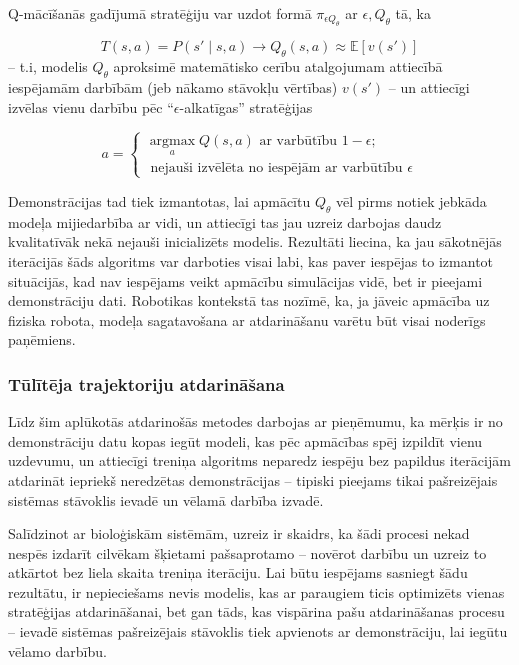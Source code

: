 \documentclass[12pt, a4paper]{article}
\numberwithin{equation}{section} %
\begin{document}
Q-mācīšanās gadījumā stratēģiju var uzdot formā $\pi_{\epsilon Q_{\theta}}$ ar $\epsilon, Q_{\theta}$ tā, ka

\begin{equation}
    T(s,a) = P(s'\mid s,a) \rightarrow Q_{\theta}(s,a) \approx \mathbb{E}[v(s')] 
\end{equation}
-- t.i, modelis $Q_{\theta}$ aproksimē matemātisko cerību atalgojumam attiecībā iespējamām darbībām (jeb nākamo stāvokļu vērtības) $v(s')$ -- un attiecīgi izvēlas vienu darbību pēc ``$\epsilon$-alkatīgas'' stratēģijas

\begin{equation}
    a = 
    \begin{cases}
        \operatorname*{argmax}_a Q(s,a) \text{ ar varbūtību } 1-\epsilon; \\
        \text{ nejauši izvēlēta no iespējām ar varbūtību } \epsilon
    \end{cases} 
\end{equation}

Demonstrācijas tad tiek izmantotas, lai apmācītu $Q_{\theta}$ vēl pirms notiek jebkāda modeļa mijiedarbība ar vidi, un attiecīgi tas jau uzreiz darbojas daudz kvalitatīvāk nekā nejauši inicializēts modelis. Rezultāti liecina, ka jau sākotnējās iterācijās šāds algoritms var darboties visai labi, kas paver iespējas to izmantot situācijās, kad nav iespējams veikt apmācību simulācijas vidē, bet ir pieejami demonstrāciju dati. Robotikas kontekstā tas nozīmē, ka, ja jāveic apmācība uz fiziska robota, modeļa sagatavošana ar atdarināšanu varētu būt visai noderīgs paņēmiens.


\subsubsection{Tūlītēja trajektoriju atdarināšana}

Līdz šim aplūkotās atdarinošās metodes darbojas ar pieņēmumu, ka mērķis ir no demonstrāciju datu kopas iegūt modeli, kas pēc apmācības spēj izpildīt vienu uzdevumu, un attiecīgi treniņa algoritms neparedz iespēju bez papildus iterācijām atdarināt iepriekš neredzētas demonstrācijas -- tipiski pieejams tikai pašreizējais sistēmas stāvoklis ievadē un vēlamā darbība izvadē.

Salīdzinot ar bioloģiskām sistēmām, uzreiz ir skaidrs, ka šādi procesi nekad nespēs izdarīt cilvēkam šķietami pašsaprotamo -- novērot darbību un uzreiz to atkārtot bez liela skaita treniņa iterāciju. Lai būtu iespējams sasniegt šādu rezultātu, ir nepieciešams nevis modelis, kas ar paraugiem ticis optimizēts vienas stratēģijas atdarināšanai, bet gan tāds, kas vispārina pašu atdarināšanas procesu -- ievadē sistēmas pašreizējais stāvoklis tiek apvienots ar demonstrāciju, lai iegūtu vēlamo darbību. 
\end{document}
